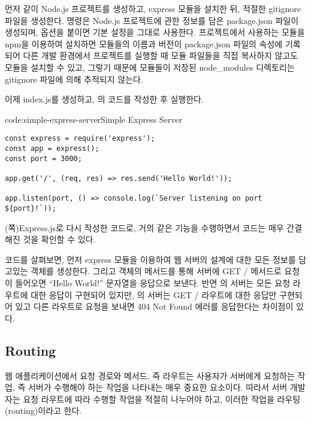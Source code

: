 먼저 \와 같이 Node.js 프로젝트를 생성하고, express 모듈을 설치한 뒤, 적절한 gitignore 파일을 생성한다.  명령은 Node.js 프로젝트에 관한 정보를 담은 package.json 파일이 생성되며,  옵션을 붙이면 기본 설정을 그대로 사용한다. 프로젝트에서 사용하는 모듈을 npm을 이용하여 설치하면 모듈들의 이름과 버전이 package.json 파일의  속성에 기록되어 다른 개발 환경에서 프로젝트를 실행할 때 모듈 파일들을 직접 복사하지 않고도 모듈을 설치할 수 있고, 그렇기 때문에 모듈들이 저장된 node\_modules 디렉토리는 gitignore 파일에 의해 추적되지 않는다.

이제 index.js를 생성하고, 의 코드를 작성한 후 실행한다.

\begin{codeenv}{code:simple-express-server}{Simple Express Server}\begin{verbatim}
const express = require('express');
const app = express();
const port = 3000;

app.get('/', (req, res) => res.send('Hello World!'));

app.listen(port, () => console.log(`Server listening on port ${port}!`));
\end{verbatim}
\end{codeenv}

\는 (\pageref{code:nodejs-simple-web-server}쪽)\를 Express.js로 다시 작성한 코드로, 거의 같은 기능을 수행하면서 코드는 매우 간결해진 것을 확인할 수 있다.

코드를 살펴보면, 먼저 express 모듈을 이용하여 웹 서버의 설계에 대한 모든 정보를 담고있는  객체를 생성한다. 그리고  객체의  메서드를 통해 서버에 GET / 메서드로 요청이 들어오면 ``Hello World!'' 문자열을 응답으로 보낸다. 반면 의 서버는 모든 요청 라우트에 대한 응답이 구현되어 있지만, 의 서버는 GET / 라우트에 대한 응답만 구현되어 있고 다른 라우트로 요청을 보내면 404 Not Found 에러를 응답한다는 차이점이 있다.

\subsection*{Routing}

웹 애플리케이션에서 요청 경로와 메서드, 즉 라우트는 사용자가 서버에게 요청하는 작업, 즉 서버가 수행해야 하는 작업을 나타내는 매우 중요한 요소이다. 따라서 서버 개발자는 요청 라우트에 따라 수행할 작업을 적절히 나누어야 하고, 이러한 작업을 라우팅(routing)이라고 한다.

